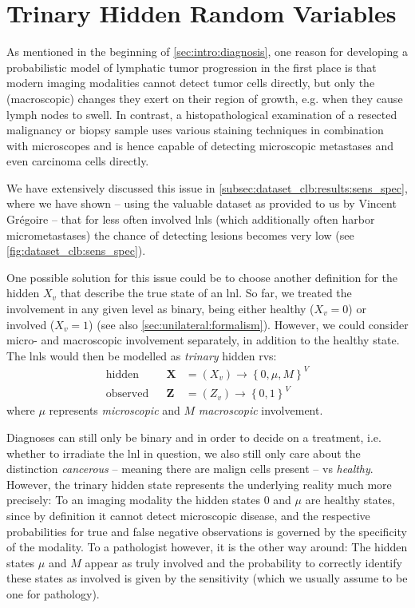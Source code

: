 \documentclass[\relativeRoot/main.tex]{subfiles}
\begin{document}
\section{Trinary Hidden Random Variables}
\label{sec:future:trinary}

As mentioned in the beginning of \cref{sec:intro:diagnosis}, one reason for developing a probabilistic model of lymphatic tumor progression in the first place is that modern imaging modalities cannot detect tumor cells directly, but only the (macroscopic) changes they exert on their region of growth, e.g. when they cause lymph nodes to swell. In contrast, a histopathological examination of a resected malignancy or biopsy sample uses various staining techniques in combination with microscopes and is hence capable of detecting microscopic metastases and even carcinoma cells directly.

We have extensively discussed this issue in \cref{subsec:dataset_clb:results:sens_spec}, where we have shown -- using the valuable dataset as provided to us by Vincent Grégoire \cite{bauwens_prevalence_2021} -- that for less often involved \glspl{lnl} (which additionally often harbor micrometastases) the chance of detecting lesions becomes very low (see \cref{fig:dataset_clb:sens_spec}).

One possible solution for this issue could be to choose another definition for the hidden  $X_v$ that describe the true state of an \gls{lnl}. So far, we treated the involvement in any given level as binary, being either healthy ($X_v=0$) or involved ($X_v=1$) (see also \cref{sec:unilateral:formalism}). However, we could consider micro- and macroscopic involvement separately, in addition to the healthy state. The \glspl{lnl} would then be modelled as \emph{trinary} hidden \glspl{rv}:
%
\begin{equation}
    \begin{aligned}
        \text{hidden}& & \mathbf{X} &= \left( X_v \right) \rightarrow \left\{ 0, \mu, M \right\}^V \\
        \text{observed}& & \mathbf{Z} &= \left( Z_v \right) \rightarrow \left\{ 0,1 \right\}^V
    \end{aligned}
\end{equation}
%
where $\mu$ represents \emph{microscopic} and $M$ \emph{macroscopic} involvement.

Diagnoses can still only be binary and in order to decide on a treatment, i.e. whether to irradiate the \gls{lnl} in question, we also still only care about the distinction \emph{cancerous} -- meaning there are malign cells present -- vs \emph{healthy}. However, the trinary hidden state represents the underlying reality much more precisely: To an imaging modality the hidden states $0$ and $\mu$ are healthy states, since by definition it cannot detect microscopic disease, and the respective probabilities for true and false negative observations is governed by the specificity of the modality. To a pathologist however, it is the other way around: The hidden states $\mu$ and $M$ appear as truly involved and the probability to correctly identify these states as involved is given by the sensitivity (which we usually assume to be one for pathology).
\end{document}
